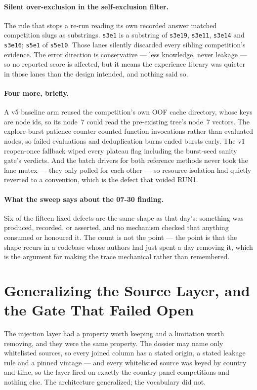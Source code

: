 \documentclass[11pt,a4paper]{article}
\begin{document}
\paragraph{Silent over-exclusion in the self-exclusion filter.} The rule that stops a re-run
reading its own recorded answer matched competition slugs as substrings. \texttt{s3e1} is a
substring of \texttt{s3e19}, \texttt{s3e11}, \texttt{s3e14} and \texttt{s3e16}; \texttt{s5e1}
of \texttt{s5e10}. Those lanes silently discarded every sibling competition's evidence. The
error direction is conservative --- less knowledge, never leakage --- so no reported score is
affected, but it means the experience library was quieter in those lanes than the design
intended, and nothing said so.

\paragraph{Four more, briefly.} A v5 baseline arm reused the competition's own OOF cache
directory, whose keys are node ids, so its node~7 could read the pre-existing tree's node~7
vectors. The explore-burst patience counter counted function invocations rather than
evaluated nodes, so failed evaluations and deduplication burns ended bursts early. The v1
reopen-once fallback wiped every plateau flag including the burst-seed sanity gate's
verdicts. And the batch drivers for both reference methods never took the lane mutex --- they
only polled for each other --- so resource isolation had quietly reverted to a convention,
which is the defect that voided RUN1.

\paragraph{What the sweep says about the 07-30 finding.} Six of the fifteen fixed defects
are the same shape as that day's: something was produced, recorded, or asserted, and no
mechanism checked that anything consumed or honoured it. The count is not the point --- the
point is that the shape recurs in a codebase whose authors had just spent a day removing it,
which is the argument for making the trace mechanical rather than remembered.

\section{Generalizing the Source Layer, and the Gate That Failed Open}

The injection layer had a property worth keeping and a limitation worth removing, and they
were the same property. The dossier may name only whitelisted sources, so every joined column
has a stated origin, a stated leakage rule and a pinned vintage --- and every whitelisted
source was keyed by country and time, so the layer fired on exactly the country-panel
competitions and nothing else. The architecture generalized; the vocabulary did not.
\end{document}
